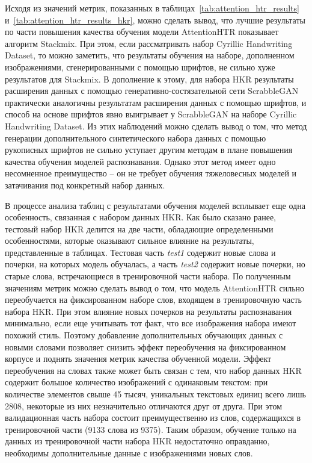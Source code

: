 Исходя из значений метрик, показанных в таблицах~\ref{tab:attention_htr_results} и~\ref{tab:attention_htr_results_hkr},
можно сделать вывод, что лучшие результаты по части повышения качества обучения модели AttentionHTR показывает алгоритм Stackmix.
При этом, если рассматривать набор Cyrillic Handwriting Dataset, то можно заметить,
что результаты обучения на наборе, дополненном изображениями, сгенерированными с помощью шрифтов, не сильно хуже результатов для Stackmix.
В дополнение к этому, для набора HKR результаты расширения данных с помощью генеративно-состязательной сети ScrabbleGAN
практически аналогичны результатам расширения данных с помощью шрифтов, и способ на основе шрифтов явно выигрывает у ScrabbleGAN
на наборе Cyrillic Handwriting Dataset.
Из этих наблюдений можно сделать вывод о том, что метод генерации дополнительного синтетического набора данных с
помощью рукописных шрифтов не сильно уступает другим методам в плане повышения качества обучения моделей распознавания.
Однако этот метод имеет одно несомненное преимущество -- он не требует обучения тяжеловесных моделей и затачивания под конкретный набор данных.

В процессе анализа таблиц с результатами обучения моделей всплывает еще одна особенность, связанная с набором данных HKR.
Как было сказано ранее, тестовый набор HKR делится на две части, обладающие определенными особенностями,
которые оказывают сильное влияние на результаты, представленные в таблицах.
Тестовая часть \textit{test1} содержит новые слова и почерки, на которых модель обучалась, а часть \textit{test2}
содержит новые почерки, но старые слова, встречающиеся в тренировочной части набора.
По полученным значениям метрик можно сделать вывод о том, что модель AttentionHTR сильно переобучается на фиксированном наборе слов,
входящем в тренировочную часть набора HKR.
При этом влияние новых почерков на результаты распознавания минимально, если еще учитывать тот факт, что все изображения набора имеют похожий стиль.
Поэтому добавление дополнительных обучающих данных с новыми словами позволяет снизить эффект переобучения на фиксированном корпусе и
поднять значения метрик качества обученной модели.
Эффект переобучения на словах также может быть связан с тем, что набор данных HKR содержит большое количество изображений с одинаковым текстом:
при количестве элементов свыше 45 тысяч, уникальных текстовых единиц всего лишь 2808, некоторые из них незначительно отличаются друг от друга.
При этом валидационная часть набора состоит преимущественно из слов, содержащихся в тренировочной части (9133 слова из 9375).
Таким образом, обучение только на данных из тренировочной части набора HKR недостаточно оправданно, необходимы дополнительные данные с изображениями новых слов.


